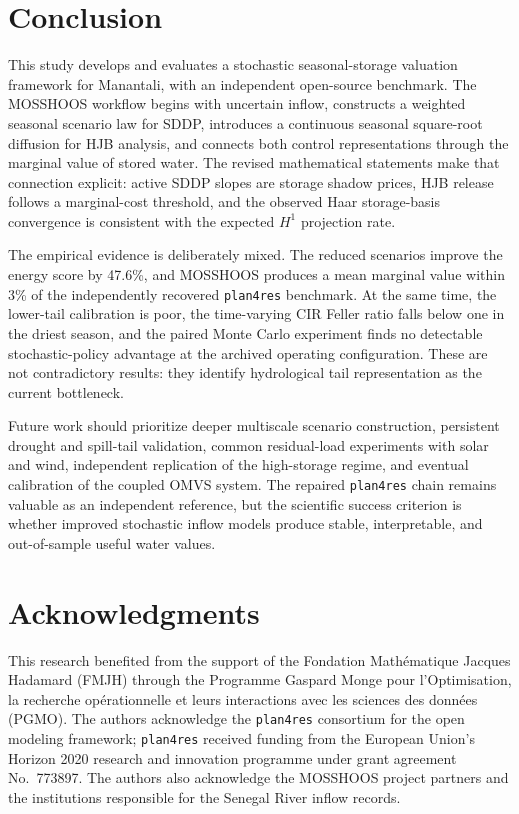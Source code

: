 \documentclass[11pt,a4paper]{article}
\begin{document}
\section{Conclusion}\label{sec:conclusion}
This study develops and evaluates a stochastic seasonal-storage valuation
framework for Manantali, with an independent open-source benchmark. The MOSSHOOS
workflow begins with uncertain inflow, constructs a weighted seasonal scenario law
for SDDP, introduces a continuous seasonal square-root diffusion for HJB analysis,
and connects both control representations through the marginal value of stored water. The revised
mathematical statements make that connection explicit: active SDDP slopes are
storage shadow prices, HJB release follows a marginal-cost threshold, and the
observed Haar storage-basis convergence is consistent with the expected $H^1$
projection rate.

The empirical evidence is deliberately mixed. The reduced scenarios improve the
energy score by 47.6\%, and MOSSHOOS produces a mean marginal value within 3\%
of the independently recovered \texttt{plan4res} benchmark. At the same time,
the lower-tail calibration is poor, the time-varying CIR Feller ratio falls below
one in the driest season, and the paired Monte Carlo experiment finds no detectable
stochastic-policy advantage at the archived operating configuration. These are
not contradictory results: they identify hydrological tail representation as the
current bottleneck.

Future work should prioritize deeper multiscale scenario construction, persistent
drought and spill-tail validation, common residual-load experiments with solar and
wind, independent replication of the high-storage regime, and eventual calibration
of the coupled OMVS system.
The repaired \texttt{plan4res} chain remains valuable as an independent reference,
but the scientific success criterion is whether improved stochastic inflow models
produce stable, interpretable, and out-of-sample useful water values.

\section*{Acknowledgments}
This research benefited from the support of the Fondation Math\'ematique Jacques
Hadamard (FMJH) through the Programme Gaspard Monge pour l'Optimisation, la
recherche op\'erationnelle et leurs interactions avec les sciences des donn\'ees
(PGMO). The authors acknowledge the \texttt{plan4res} consortium for the open
modeling framework; \texttt{plan4res} received funding from the European Union's
Horizon 2020 research and innovation programme under grant agreement No.~773897.
The authors also acknowledge the MOSSHOOS project partners and the institutions
responsible for the Senegal River inflow records.
\end{document}
